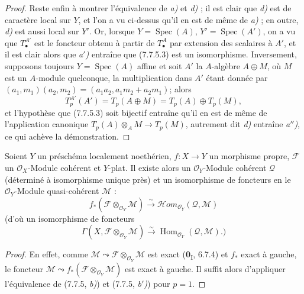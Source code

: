 \begin{proof}
Reste enfin à montrer l'équivalence de \emph{a)} et \emph{d)} ; il est clair que \emph{d)} est de
caractère local sur $Y$, et l'on a vu ci-dessus qu'il en est de même de \emph{a)} ; en
outre, \emph{d)} est aussi local sur $Y'$. Or, lorsque $Y=\operatorname{Spec}(A)$,
$Y'=\operatorname{Spec}(A')$, on a vu que $T_\bullet^{A'}$ est le foncteur obtenu
à partir de $T_\bullet^A$ par extension des scalaires à $A'$, et il est clair
alors que \emph{a$'$)} entraîne que (7.7.5.3) est un isomorphisme. Inversement, supposons
toujours $Y=\operatorname{Spec}(A)$ affine et soit $A'$ la $A$-algèbre
$A\oplus M$, où $M$ est un $A$-module quelconque, la multiplication dans $A'$
étant donnée par
$(a_1,m_1)(a_2,m_2)=(a_1a_2,a_1m_2+a_2m_1)$;
alors
\[
  T_p^{A'}(A')
  =
  T_p(A\oplus M)
  =
  T_p(A)\oplus T_p(M),
\]
et l'hypothèse que (7.7.5.3) soit bijectif entraîne qu'il en est de même de
l'application canonique
$T_p(A)\otimes_A M\longrightarrow T_p(M)$,
autrement dit \emph{d)} entraîne \emph{a$''$)}, ce qui achève la démonstration.
\end{proof}

\begin{theorem}[7.7.6]
Soient $Y$ un préschéma localement noethérien, $f:X\to Y$ un morphisme propre,
$\mathscr F$ un $\mathscr O_X$-Module cohérent et $Y$-plat. Il existe alors un
$\mathscr O_Y$-Module cohérent $\mathscr Q$ (déterminé à isomorphisme unique près)
et un isomorphisme de foncteurs en le $\mathscr O_Y$-Module quasi-cohérent
$\mathscr M$ :
\[
  f_*(\mathscr F\otimes_{\mathscr O_Y}\mathscr M)
  \xrightarrow{\sim}
  \mathscr{H}\!om_{\mathscr O_Y}(\mathscr Q,\mathscr M)
  \tag{7.7.6.1}\label{III.7.7.6.1.fr}
\]
\textup{(d'où un isomorphisme de foncteurs}
\[
  \Gamma(X,\mathscr F\otimes_{\mathscr O_Y}\mathscr M)
  \xrightarrow{\sim}
  \operatorname{Hom}_{\mathscr O_Y}(\mathscr Q,\mathscr M).)
  \tag{7.7.6.2}\label{III.7.7.6.2.fr}
\]
\end{theorem}

\begin{proof}
En effet, comme $\mathscr M\leadsto\mathscr F\otimes_{\mathscr O_Y}\mathscr M$ est
exact (\textbf{0}\textsubscript{I}, 6.7.4) et $f_*$ exact à gauche, le foncteur
$\mathscr M\leadsto f_*(\mathscr F\otimes_{\mathscr O_Y}\mathscr M)$ est exact à
gauche. Il suffit alors d'appliquer l'équivalence de (7.7.5, \emph{b)}) et (7.7.5,
\emph{b$'$)}) pour $p=1$.
\end{proof}

